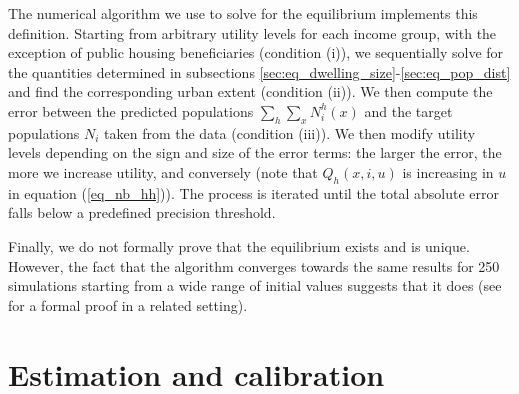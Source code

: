 \documentclass[12pt]{article}
\begin{document}
The numerical algorithm we use to solve for the equilibrium implements this definition. Starting from arbitrary utility levels for each income group, with the exception of public housing beneficiaries (condition (i)), we sequentially solve for the quantities determined in subsections \ref{sec:eq_dwelling_size}-\ref{sec:eq_pop_dist} and find the corresponding urban extent (condition (ii)). We then compute the error between the predicted populations $\sum\limits_h\sum\limits_xN_i^h(x)$ and the target populations $N_i$ taken from the data (condition (iii)). We then modify utility levels depending on the sign and size of the error terms: the larger the error, the more we increase utility, and conversely (note that $Q_h(x,i,u)$ is increasing in $u$ in equation (\ref{eq_nb_hh})). The process is iterated until the total absolute error falls below a predefined precision threshold.



Finally, we do not formally prove that the equilibrium exists and is unique. However, the fact that the algorithm converges towards the same results for 250 simulations starting from a wide range of initial values suggests that it does (see \citet{Gaigne2022WhoSorting} for a formal proof in a related setting).


\section{Estimation and calibration\label{sec:estimation}}
\end{document}
